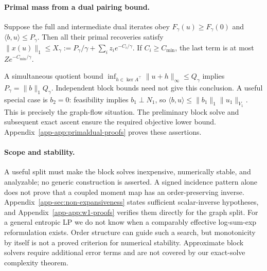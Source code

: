 \paragraph{Primal mass from a dual pairing bound.}
\begin{proposition}\label{prop:mass-bound-block}
Suppose the full and intermediate dual iterates obey $F_\gamma(u)\geq F_\gamma(0)$ and $\langle b,u\rangle\leq P_\gamma$. Then all their primal recoveries satisfy
$\|x(u)\|_1\leq X_\gamma:=P_\gamma/\gamma+\sum_i z_i e^{-C_i/\gamma}$.
If $C_i\geq C_{\min}$, the last term is at most $Z e^{-C_{\min}/\gamma}$.
\end{proposition}
A simultaneous quotient bound $\inf_{h\in\ker A^\top}\|u+h\|_\infty\leq Q_\gamma$ implies $P_\gamma=\|b\|_1Q_\gamma$. Independent block bounds need not give this conclusion. A useful special case is $b_2=0$: feasibility implies $b_1\perp N_1$, so $\langle b,u\rangle\leq\|b_1\|_1\|u_1\|_{V_1}$. This is precisely the graph-flow situation. The preliminary block solve and subsequent exact ascent ensure the required objective lower bound. Appendix~\ref{app-app:primaldual-proofs} proves these assertions.

\paragraph{Scope and stability.}
A useful split must make the block solves inexpensive, numerically stable, and analyzable; no generic construction is asserted. A signed incidence pattern alone does not prove that a coupled moment map has an order-preserving inverse. Appendix~\ref{app-sec:non-expansiveness} states sufficient scalar-inverse hypotheses, and Appendix~\ref{app-app:w1-proofs} verifies them directly for the graph split. For a general entropic LP we do not know when a comparably effective log-sum-exp reformulation exists. Order structure can guide such a search, but monotonicity by itself is not a proved criterion for numerical stability. Approximate block solvers require additional error terms and are not covered by our exact-solve complexity theorem.
